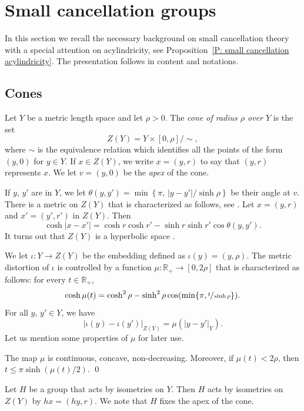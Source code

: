 \section{Small cancellation groups}
In this section we recall the necessary background on small cancellation theory with a special attention on acylindricity, see Proposition~\ref{P: small cancellation acylindricity}.
The presentation follows \cite{coulon_geometry_2014} in content and notations.

\subsection{Cones}

Let $Y$ be a metric length space and let $\rho>0$.
The \emph{cone of radius $\rho$ over $Y$} is the set
\[
Z(Y)= Y\times [0,\rho]/\sim,
\]
where $\sim$ is the equivalence relation which identifies all the points of the form $(y,0)$ for $y \in Y$.
If $x\in Z (Y)$, we write $x=(y,r)$ to say that $(y,r)$ represents $x$. We let $v=(y,0)$ be the \emph{apex} of the cone.

If $y$, $y'$ are in $Y$, we let $\theta(y,y')=\min\left\{ \pi,\, |y-y'|/\sinh\rho\right\}$ be their angle at $v$. There is a metric on $Z(Y)$ that is characterized as follows, see \cite[Ch.\,I.5]{bridson_metric_1999}.
Let $x=(y,r)$ and $x'=(y',r')$ in $Z(Y)$. Then
\[
\cosh |x-x'| = \cosh r \cosh r' -\sinh r \sinh r' \cos \theta (y,y').
\]
It turns out that $Z(Y)$ is a hyperbolic space \cite[Prop.\,4.6]{coulon_geometry_2014}.

We let $\iota: Y \to Z(Y)$ be the embedding defined as $\iota(y)=(y,\rho)$. The metric distortion of $\iota$ is controlled by a function $\mu: \mathbb{R}_+ \to [0,2\rho]$ that is characterized as follows: for every $ t\in \mathbb{R}_+$,
\[
\cosh \mu(t) = \cosh^2 \rho - \sinh^2 \rho \cos( \min\{\pi, \sfrac t{\sinh \rho}\}).
\]
For all $y,\, y' \in Y$, we have
\begin{equation}
\label{L: distortion} |\iota(y)-\iota(y')|_{Z(Y)}=\mu(|y-y'|_Y).
\end{equation}
Let us mention some properties of $\mu$ for later use.

\begin{prop}\label{P: mu} The map $\mu$ is continuous, concave, non-decreasing. Moreover, if $\mu(t)< 2\rho$, then $t \leqslant \pi \sinh (\mu(t)/2)$. \qed
\end{prop}

Let $H$ be a group that acts by isometries on $Y$. Then $H$ acts by isometries on $Z(Y)$ by $hx=(hy,r)$. We note that $H$ fixes the apex of the cone.

